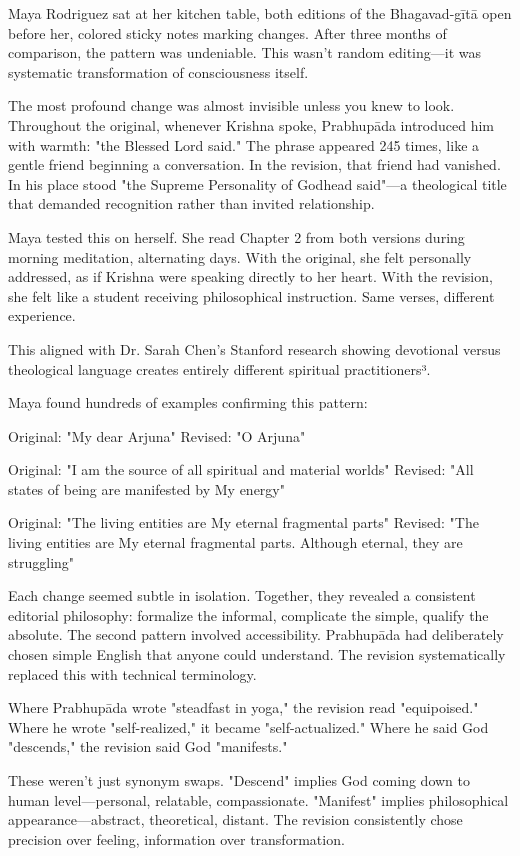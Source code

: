 \documentclass[11pt,twoside]{book}
\begin{document}
\normalfont\justifying
Maya Rodriguez sat at her kitchen table, both editions of the Bhagavad-gītā open before her, colored sticky notes marking changes. After three months of comparison, the pattern was undeniable. This wasn't random editing—it was systematic transformation of consciousness itself.

The most profound change was almost invisible unless you knew to look. Throughout the original, whenever Krishna spoke, Prabhupāda introduced him with warmth: "the Blessed Lord said." The phrase appeared 245 times, like a gentle friend beginning a conversation. In the revision, that friend had vanished. In his place stood "the Supreme Personality of Godhead said"—a theological title that demanded recognition rather than invited relationship.

Maya tested this on herself. She read Chapter 2 from both versions during morning meditation, alternating days. With the original, she felt personally addressed, as if Krishna were speaking directly to her heart. With the revision, she felt like a student receiving philosophical instruction. Same verses, different experience.

This aligned with Dr. Sarah Chen's Stanford research showing devotional versus theological language creates entirely different spiritual practitioners³.

Maya found hundreds of examples confirming this pattern:

Original: "My dear Arjuna" 
Revised: "O Arjuna"

Original: "I am the source of all spiritual and material worlds"
Revised: "All states of being are manifested by My energy"

Original: "The living entities are My eternal fragmental parts"
Revised: "The living entities are My eternal fragmental parts. Although eternal, they are struggling"

Each change seemed subtle in isolation. Together, they revealed a consistent editorial philosophy: formalize the informal, complicate the simple, qualify the absolute.
The second pattern involved accessibility. Prabhupāda had deliberately chosen simple English that anyone could understand. The revision systematically replaced this with technical terminology. 

Where Prabhupāda wrote "steadfast in yoga," the revision read "equipoised." Where he wrote "self-realized," it became "self-actualized." Where he said God "descends," the revision said God "manifests." 

These weren't just synonym swaps. "Descend" implies God coming down to human level—personal, relatable, compassionate. "Manifest" implies philosophical appearance—abstract, theoretical, distant. The revision consistently chose precision over feeling, information over transformation.
\end{document}
